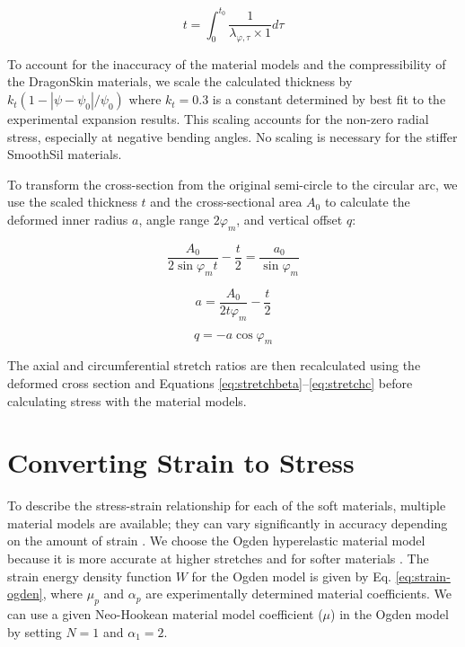\begin{equation}
    t = \int_0^{t_0} \frac{1}{\lambda_{\varphi,\tau} \times 1} d\tau 
    \label{eq:thicknessfromlambdar}
\end{equation}

To account for the inaccuracy of the material models and the compressibility of the DragonSkin materials, we scale the calculated thickness by $k_t(1-|\psi-\psi_0|/\psi_0)$ where $k_t = 0.3$ is a constant determined by best fit to the experimental expansion results. This scaling accounts for the non-zero radial stress, especially at negative bending angles. No scaling is necessary for the stiffer SmoothSil materials. 

To transform the cross-section from the original semi-circle to the circular arc, we use the scaled thickness $t$ and the cross-sectional area $A_0$ to calculate the deformed inner radius $a$, angle range $2\varphi_m$, and vertical offset $q$:

\begin{equation}
    \frac{A_0}{2\sin{\varphi_m}t}-\frac{t}{2}=\frac{a_0}{\sin{\varphi_m}}
    \label{eq:phi_m}
\end{equation}

\begin{equation}
    a=\frac{A_0}{2t\varphi_m}-\frac{t}{2}
    \label{eq:a_aug}
\end{equation}

\begin{equation}
    q=-a\cos{\varphi_m}
    \label{eq:q_aug}
\end{equation}

The axial and circumferential stretch ratios are then recalculated using the deformed cross section and Equations \ref{eq:stretchbeta}--\ref{eq:stretchc} before calculating stress with the material models.

\section{Converting Strain to Stress}

To describe the stress-strain relationship for each of the soft materials, multiple material models are available; they can vary significantly in accuracy depending on the amount of strain \cite{paterno_hybrid_2018}. We choose the Ogden hyperelastic material model because it is more accurate at higher stretches and for softer materials \cite{marechal_toward_2021}. The strain energy density function $W$ for the Ogden model is given by Eq. \ref{eq:strain-ogden}, where $\mu_{p}$ and $\alpha_{p}$ are experimentally determined material coefficients. We can use a given Neo-Hookean material model coefficient ($\mu$) in the Ogden model by setting $N=1$ and $\alpha_1=2$. 

